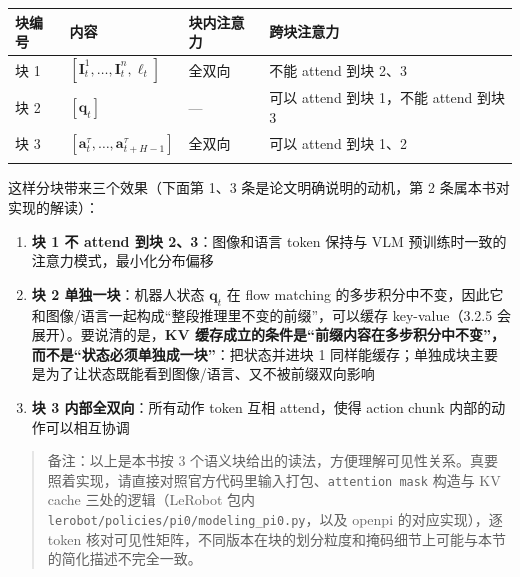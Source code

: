 \documentclass[
  chinese,
]{ctexart}
\providecommand{\tightlist}{%
  \setlength{\itemsep}{0pt}\setlength{\parskip}{0pt}}
\begin{document}
\begin{center}
\begin{tabular}{@{}>{\raggedright\arraybackslash}p{} >{\raggedright\arraybackslash}p{} >{\raggedright\arraybackslash}p{} >{\raggedright\arraybackslash}p{}@{}}
\toprule\noalign{}
块编号 & 内容 & 块内注意力 & 跨块注意力 \\
\midrule\noalign{}
块 1 & \([\mathbf{I}^1_t, \ldots, \mathbf{I}^n_t, \ell_t]\) & 全双向 & 不能 attend 到块 2、3 \\
块 2 & \([\mathbf{q}_t]\) & --- & 可以 attend 到块 1，不能 attend 到块 3 \\
块 3 & \([\mathbf{a}^\tau_t, \ldots, \mathbf{a}^\tau_{t+H-1}]\) & 全双向 & 可以 attend 到块 1、2 \\
\bottomrule\noalign{}
\end{tabular}
\end{center}

这样分块带来三个效果（下面第 1、3 条是论文明确说明的动机，第 2
条属本书对实现的解读）：

\begin{enumerate}
\def\labelenumi{\arabic{enumi}.}
\tightlist
\item
  \textbf{块 1 不 attend 到块 2、3}：图像和语言 token 保持与 VLM
  预训练时一致的注意力模式，最小化分布偏移
\item
  \textbf{块 2 单独一块}：机器人状态 \(\mathbf{q}_t\) 在 flow matching
  的多步积分中不变，因此它和图像/语言一起构成``整段推理里不变的前缀''，可以缓存
  key-value（3.2.5 会展开）。要说清的是，\textbf{KV
  缓存成立的条件是``前缀内容在多步积分中不变''，而不是``状态必须单独成一块''}：把状态并进块
  1
  同样能缓存；单独成块主要是为了让状态既能看到图像/语言、又不被前缀双向影响
\item
  \textbf{块 3 内部全双向}：所有动作 token 互相 attend，使得 action
  chunk 内部的动作可以相互协调
\end{enumerate}

\begin{quote}
备注：以上是本书按 3
个语义块给出的读法，方便理解可见性关系。真要照着实现，请直接对照官方代码里输入打包、\texttt{attention\ mask}
构造与 KV cache 三处的逻辑（LeRobot 包内
\texttt{lerobot/policies/pi0/modeling\_pi0.py}，以及 openpi
的对应实现），逐 token
核对可见性矩阵，不同版本在块的划分粒度和掩码细节上可能与本节的简化描述不完全一致。
\end{quote}
\end{document}
